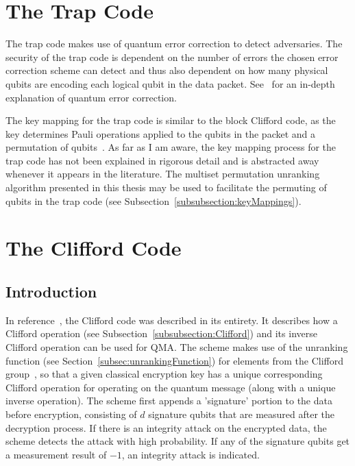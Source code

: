 \section{The Trap Code}
The trap code makes use of quantum error correction to detect adversaries. The security of the trap code is dependent on the number of errors the chosen error correction scheme can detect and thus also dependent on how many physical qubits are encoding each logical qubit in the data packet. See~\cite{nielsen2002quantum} for an in-depth explanation of quantum error correction.

The key mapping for the trap code is similar to the block Clifford code, as the key determines Pauli operations applied to the qubits in the packet and a permutation of qubits~\cite{broadbent2013quantum}. As far as I am aware, the key mapping process for the trap code has not been explained in rigorous detail and is abstracted away whenever it appears in the literature. The multiset permutation unranking algorithm presented in this thesis may be used to facilitate the permuting of qubits in the trap code (see Subsection~\ref{subsubsection:keyMappings}).



\section{The Clifford Code}
\label{sec:IntegrityDetectionUsingCliffordOperationEncryption}
\subsection{Introduction}
In reference~\cite{barbeau2022authenticity}, the Clifford code was described in its entirety. It describes how a Clifford operation (see Subsection~\ref{subsubsection:Clifford}) and its inverse Clifford operation can be used for QMA. The scheme makes use of the unranking function (see Section~\ref{subsec:unrankingFunction}) for elements from the Clifford group~\cite{Koenig2014}, so that a given classical encryption key has a unique corresponding Clifford operation for operating on the quantum message (along with a unique inverse operation). The scheme first appends a 'signature' portion to the data before encryption, consisting of $d$ signature qubits that are measured after the decryption process. If there is an integrity attack on the encrypted data, the scheme detects the attack with high probability. If any of the signature qubits get a measurement result of $-1$, an integrity attack is indicated.
